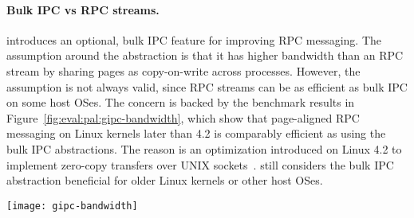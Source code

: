 \paragraph{Bulk IPC vs RPC streams.}
\Thehostabi{} introduces an optional, bulk IPC feature for improving RPC messaging.
The assumption around the
abstraction
is that it has higher bandwidth
than an RPC stream
by sharing pages as copy-on-write across processes.
However,
the assumption is not always valid, since RPC streams
can be as efficient as bulk IPC on some host OSes.
The concern is backed by the benchmark results in Figure~\ref{fig:eval:pal:gipc-bandwidth},
which show that
page-aligned RPC messaging on Linux kernels later than 4.2
is comparably efficient
as using the bulk IPC abstractions.
The reason is an optimization introduced on Linux 4.2
to implement zero-copy transfers
over UNIX sockets~\cite{linux4.2-unix}.
\graphene{} still considers the bulk IPC abstraction
beneficial for older Linux kernels
or other host OSes. 



\begin{figure*}[t!]
\centering
\footnotesize
\texttt{[image: gipc-bandwidth]}
\caption{Bandwidth of sending large messages over (a) RPC streams and (b) Bulk IPC channels. The messages are sent in different sizes (1MB to 256MB), and either aligned or unaligned with the page boundary.
Higher is better. Both abstractions are benchmarked on Linux kernel 3.19 and 4.10 as the hosts. The impact of the \seccomp{} filter or reference monitor is marginal (less than 1\%).}
\label{fig:eval:pal:gipc-bandwidth}
\end{figure*}


 




